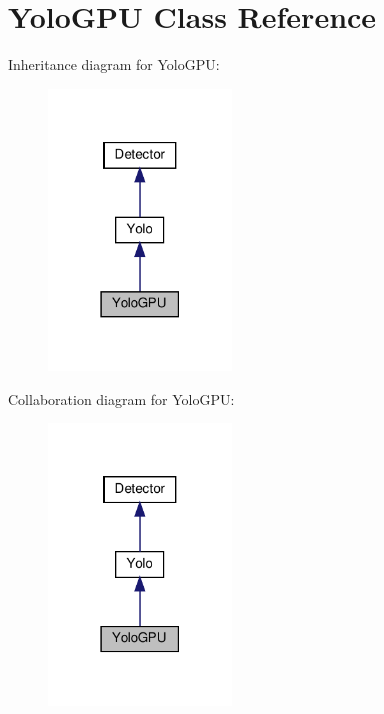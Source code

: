 \section{Yolo\+G\+PU Class Reference}
\label{class_yolo_g_p_u}


Inheritance diagram for Yolo\+G\+PU\+:
\nopagebreak
\begin{figure}[H]
\begin{center}
\leavevmode
\includegraphics[width=138pt]{class_yolo_g_p_u__inherit__graph}
\end{center}
\end{figure}


Collaboration diagram for Yolo\+G\+PU\+:
\nopagebreak
\begin{figure}[H]
\begin{center}
\leavevmode
\includegraphics[width=138pt]{class_yolo_g_p_u__coll__graph}
\end{center}
\end{figure}
